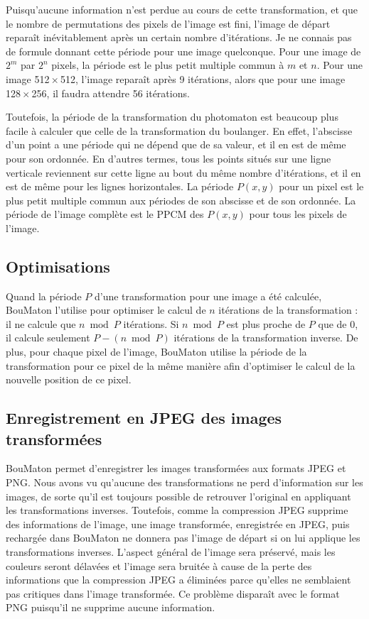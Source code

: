 \documentclass[a4paper]{article}
\newcommand{\BouMaton}{\textsf{BouMaton}\xspace}
\newcommand{\picdim}[2]{#1\,\(\times\)\,#2}
\begin{document}
  Puisqu'aucune information n'est perdue au cours de cette 
  transformation, et que le nombre de permutations des pixels de 
  l'image est fini, l'image de départ reparaît inévitablement après un 
  certain nombre d'itérations. Je ne connais pas de formule donnant 
  cette période pour une image quelconque. Pour une image de \(2^m\) 
  par \(2^n\) pixels, la période est le plus petit multiple commun à 
  \(m\) et \(n\). Pour une image \picdim{512}{512}, l'image reparaît 
  après 9 itérations, alors que pour une image \picdim{128}{256}, il 
  faudra attendre 56 itérations.

  Toutefois, la période de la transformation du photomaton est
  beaucoup plus facile à calculer que celle de la transformation du
  boulanger. En effet, l'abscisse d'un point a une période qui ne
  dépend que de sa valeur, et il en est de même pour son ordonnée.
  En d'autres termes, tous les points situés sur une ligne verticale
  reviennent sur cette ligne au bout du même nombre d'itérations, et
  il en est de même pour les lignes horizontales. La période
  \(P(x,y)\) pour un pixel est le plus petit multiple commun aux
  périodes de son abscisse et de son ordonnée. La période de
  l'image complète est le PPCM des \(P(x,y)\) pour tous les pixels de
  l'image.
  
  \subsection{Optimisations}
  Quand la période \(P\) d'une transformation pour une image a été 
  calculée, \BouMaton l'utilise pour optimiser le calcul de \(n\) 
  itérations de la transformation : il ne calcule que \(n \bmod P\) 
  itérations. Si \(n \bmod P\) est plus proche de \(P\) que de 0, il 
  calcule seulement \(P - (n \bmod P)\) itérations de la transformation 
  inverse. De plus, pour chaque pixel de l'image, \BouMaton utilise la 
  période de la transformation pour ce pixel de la même manière afin 
  d'optimiser le calcul de la nouvelle position de ce pixel.
  
  \subsection{Enregistrement en JPEG des images transformées}
  \BouMaton permet d'enregistrer les images transformées aux formats 
  JPEG et PNG. Nous avons vu qu'aucune des transformations ne perd
  d'information sur les images, de sorte qu'il est toujours possible
  de retrouver l'original en appliquant les transformations inverses. 
  Toutefois, comme la compression JPEG supprime des informations de
  l'image, une image transformée, enregistrée en JPEG, puis
  rechargée dans \BouMaton ne donnera pas l'image de départ si on
  lui applique les transformations inverses.  L'aspect général de
  l'image sera préservé, mais les couleurs seront délavées et
  l'image sera bruitée à cause de la perte des informations que la
  compression JPEG a éliminées parce qu'elles ne semblaient pas
  critiques dans l'image transformée. Ce problème disparaît avec le 
  format PNG puisqu'il ne supprime aucune information.
\end{document}
